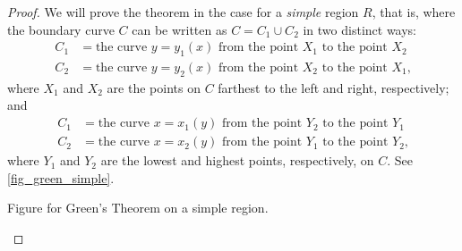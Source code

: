 \begin{proof}
 We will prove the theorem in the case for a \emph{simple} region $R$, that is, where the boundary curve $C$ can be written as $C = C_1 \cup C_2$ in two distinct ways:
 \begin{align}
  C_1 &= \text{the curve $y = y_1(x)$ from the point $X_1$ to the point $X_2$} \label{green_bottom}\\
  C_2 &= \text{the curve $y = y_2(x)$ from the point $X_2$ to the point $X_1$,}\label{green_top}
 \end{align}
 where $X_1$ and $X_2$ are the points on $C$ farthest to the left and right, respectively; and
 \begin{align}
  C_1 &= \text{the curve $x = x_1(y)$ from the point $Y_2$ to the point $Y_1$}\label{green_left}\\
  C_2 &= \text{the curve $x = x_2(y)$ from the point $Y_1$ to the point $Y_2$,}\label{green_right}
 \end{align}
 where $Y_1$ and $Y_2$ are the lowest and highest points, respectively, on $C$.
 See \autoref{fig_green_simple}.

 \begin{lxfigure}
 \centering
 \caption{Figure for Green's Theorem on a simple region.}
 \label{fig_green_simple}
 \end{lxfigure}


\end{proof}
